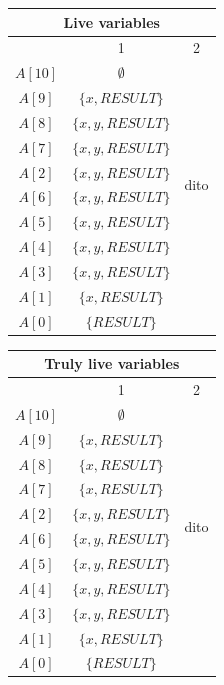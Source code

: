 \documentclass[a4paper]{article}
\begin{document}
\begin{tabular}{|c|c|c|}
  \hline
  \multicolumn{3}{|c|}{Live variables} \\
  \hline
            & 1   &  2  \\ \hline
  $ A[10] $ & $ \emptyset $           & \multirow{10}{*}{dito} \\ \cline{1-2}
  $ A[9] $  & $ \{ x, RESULT \} $     & \\ \cline{1-2}
  $ A[8] $  & $ \{ x, y, RESULT \} $  & \\ \cline{1-2}
  $ A[7] $  & $ \{ x, y, RESULT \} $  & \\ \cline{1-2}
  $ A[2] $  & $ \{ x, y, RESULT \} $  & \\ \cline{1-2}
  $ A[6] $  & $ \{ x, y, RESULT \} $  & \\ \cline{1-2}
  $ A[5] $  & $ \{ x, y, RESULT \} $  & \\ \cline{1-2}
  $ A[4] $  & $ \{ x, y, RESULT \} $  & \\ \cline{1-2}
  $ A[3] $  & $ \{ x, y, RESULT \} $  & \\ \cline{1-2}
  $ A[1] $  & $ \{ x, RESULT \} $     & \\ \cline{1-2}
  $ A[0] $  & $ \{ RESULT \} $        & \\ \hline
\end{tabular}

\vspace{1cm}

\begin{tabular}{|c|c|c|}
  \hline
  \multicolumn{3}{|c|}{Truly live variables} \\
  \hline
            & 1   &  2  \\ \hline
  $ A[10] $ & $ \emptyset $           & \multirow{10}{*}{dito} \\ \cline{1-2}
  $ A[9] $  & $ \{ x, RESULT \} $     & \\ \cline{1-2}
  $ A[8] $  & $ \{ x, RESULT \} $     & \\ \cline{1-2}
  $ A[7] $  & $ \{ x, RESULT \} $     & \\ \cline{1-2}
  $ A[2] $  & $ \{ x, y, RESULT \} $     & \\ \cline{1-2}
  $ A[6] $  & $ \{ x, y, RESULT \} $     & \\ \cline{1-2}
  $ A[5] $  & $ \{ x, y, RESULT \} $     & \\ \cline{1-2}
  $ A[4] $  & $ \{ x, y, RESULT \} $     & \\ \cline{1-2}
  $ A[3] $  & $ \{ x, y, RESULT \} $     & \\ \cline{1-2}
  $ A[1] $  & $ \{ x, RESULT \} $     & \\ \cline{1-2}
  $ A[0] $  & $ \{ RESULT \} $        & \\ \hline
\end{tabular}
\end{document}
